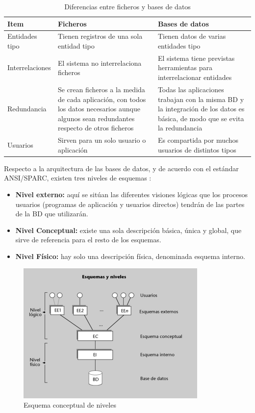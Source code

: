 \begin{table}[H]
\centering
\begin{tabular}{|p{3cm}|p{4cm}|p{4cm}|}
\hline
Item&Ficheros&Bases de datos \\
\hline
Entidades tipo&Tienen registros de una sola entidad tipo&Tienen datos de varias entidades tipo\\
\hline
Interrelaciones&El sistema no interrelaciona ficheros&El sistema tiene previstas herramientas para interrelacionar entidades\\
\hline
Redundancia& Se crean ficheros a la medida de cada aplicación, con todos los datos necesarios aunque algunos sean redundantes respecto de otros ficheros&Todas las aplicaciones trabajan con la misma BD y la integración de los datos es básica, de modo que se evita la redundancia\\
\hline
Usuarios& Sirven para un solo usuario o aplicación&Es compartida por muchos usuarios de distintos tipos \\
\hline

\end{tabular}
\caption{Diferencias entre ficheros y bases de datos \parencite{camps2005}}
\end{table}

Respecto a la arquitectura de las bases de datos, y de acuerdo con el estándar ANSI/SPARC, existen tres niveles de esquemas \parencite{camps2005}:

\begin{itemize}
\item \textbf{Nivel externo:} aquí se sitúan las diferentes visiones lógicas que los procesos usuarios (programas de aplicación y usuarios directos) tendrán de las partes de la BD que utilizarán.
\item \textbf{Nivel Conceptual:} existe una sola descripción básica, única y global, que sirve de referencia para el resto de los esquemas.
\item \textbf{Nivel Físico:} hay solo una descripción física, denominada esquema interno.
\end{itemize}

\begin{figure}[H]
\centering
\includegraphics[scale=0.9]{images/arqbd.png}
\caption{Esquema conceptual de niveles \parencite{camps2005}}
\end{figure}

